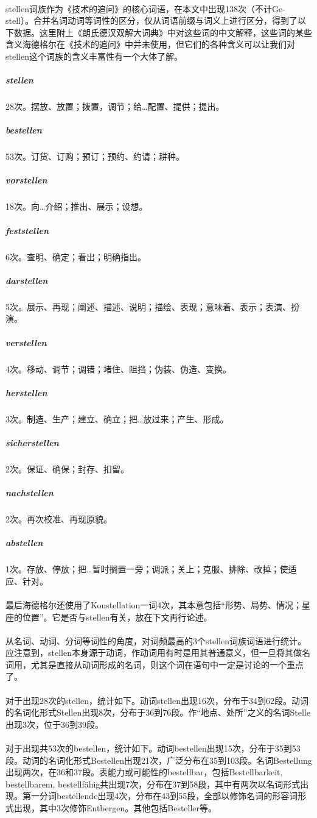 \documentclass{article}
\begin{document}
			\paragraph{}
			stellen词族作为《技术的追问》的核心词语，在本文中出现138次（不计Ge-stell）。合并名词动词等词性的区分，仅从词语前缀与词义上进行区分，得到了以下数据。这里附上《朗氏德汉双解大词典》中对这些词的中文解释，这些词的某些含义海德格尔在《技术的追问》中并未使用，但它们的各种含义可以让我们对stellen这个词族的含义丰富性有一个大体了解。
			\subparagraph{stellen}
			28次。摆放、放置；拨置，调节；给…配置、提供；提出。
			\subparagraph{bestellen}
			53次。订货、订购；预订；预约、约请；耕种。
			\subparagraph{vorstellen}
			18次。向…介绍；推出、展示；设想。
			\subparagraph{feststellen}
			6次。查明、确定；看出；明确指出。
			\subparagraph{darstellen}
			5次。展示、再现；阐述、描述、说明；描绘、表现；意味着、表示；表演、扮演。
			\subparagraph{verstellen}
			4次。移动、调节；调错；堵住、阻挡；伪装、伪造、变换。
			\subparagraph{herstellen}
			3次。制造、生产；建立、确立；把…放过来；产生、形成。
			\subparagraph{sicherstellen}
			2次。保证、确保；封存、扣留。
			\subparagraph{nachstellen}
			2次。再次校准、再现原貌。
			\subparagraph{abstellen}
			1次。存放、停放；把…暂时搁置一旁；调派；关上；克服、排除、改掉；使适应、针对。
			\paragraph{}			
			最后海德格尔还使用了Konstellation一词4次，其本意包括“形势、局势、情况；星座的位置”。它是否与stellen有关，放在下文再行论述。
			\paragraph{}	
			从名词、动词、分词等词性的角度，对词频最高的3个stellen词族词语进行统计。应注意到，stellen本身源于动词，作动词用有时是用其普通意义，但一旦将其做名词用，尤其是直接从动词形成的名词，则这个词在语句中一定是讨论的一个重点了。
			\paragraph{}	
对于出现28次的stellen，统计如下。动词stellen出现16次，分布于34到62段。动词的名词化形式Stellen出现8次，分布于36到76段。作“地点、处所”之义的名词Stelle出现3次，位于36到39段。
			\paragraph{}	
对于出现共53次的bestellen，统计如下。动词bestellen出现15次，分布于35到53段。动词的名词化形式Bestellen出现21次，广泛分布在35到103段。名词Bestellung出现两次，在36和37段。表能力或可能性的bestellbar，包括Bestellbarkeit, bestellbarem, bestellfähig共出现7次，分布在37到58段，其中有两次以名词形式出现。第一分词bestellende出现4次，分布在43到55段，全部以修饰名词的形容词形式出现，其中3次修饰Entbergen。其他包括Besteller等。
\end{document}
